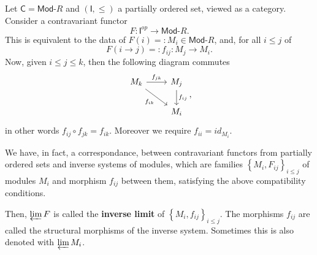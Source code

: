 \begin{ex}
	Let $\mathsf{C} = \mathsf{Mod}\text{-}R$ and $\left( \mathsf{I}, \leq \right)$ a partially ordered set, viewed as a category.
	Consider a contravariant functor
	\begin{equation}
	F: \mathsf{I}^{op} \to \mathsf{Mod}\text{-}R
	.\end{equation} 
	This is equivalent to the data of $F(i) =: M_i \in \mathsf{Mod}\text{-}R$, and, for all $i \leq j$ of
	\begin{equation}
		F(i \to j) =: f_{ij}: M_j \to M_i
	.\end{equation} 
	Now, given $i \leq j \leq k$, then the following diagram commutes
	\begin{equation}
	\begin{tikzcd}
		M_k \arrow[r, "f_{jk}", rightarrow] \arrow[rd, "f_{ik}"', rightarrow] &
		M_j \arrow[d, "f_{ij}", rightarrow] \\
		& M_i
	\end{tikzcd}
	,\end{equation} 
	in other words $f_{ij} \circ f_{jk} = f_{ik}$.
	Moreover we require $f_{ii} = id_{M_i}$.

	We have, in fact, a correspondance, between contravariant functors from partially ordered sets and
	inverse systems of modules, which are families $\left\{ M_i, F_{ij} \right\}_{i \leq j}$ of modules $M_i$ and morphism $f_{ij}$ between them, satisfying the above compatibility conditions.

	Then, $\varprojlim F$ is called the \textbf{inverse limit} of $\left\{ M_i, f_{ij} \right\}_{i \leq j}$.
	The morphisms $f_{ij}$ are called the structural morphisms of the inverse system.
	Sometimes this is also denoted with $\varprojlim M_i$.
	

\end{ex}
